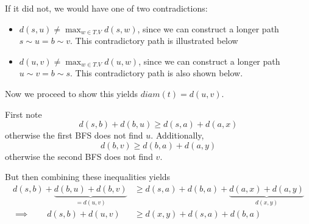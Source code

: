 \documentclass[paper=a4, fontsize=11pt]{scrartcl} %
\numberwithin{equation}{section} %
\numberwithin{figure}{section} %
\numberwithin{table}{section} %
\begin{document}
If it did not, we would have one of two contradictions:
\begin{itemize}
\item $d(s,u) \ne \max_{w \in T.V} d(s, w)$, since we can construct a longer path $s \sim u = b \sim v$. This contradictory path is illustrated below

\begin{center}
\end{center}

\item $d(u,v) \ne \max_{w \in T.V} d(u, w)$, since we can construct a longer path $u \sim v = b \sim s$. This contradictory path is also shown below.

\begin{center}
\end{center}
\end{itemize}

Now we proceed to show this yields $diam(t)  = d(u,v)$.

First note
\[d(s, b) + d(b, u) \geq d(s,a) + d(a,x)\]
otherwise the first BFS does not find $u$.
Additionally, 
\[d(b, v) \geq d(b,a) + d(a,y)\]
otherwise the second BFS does not find $v$.

But then combining these inequalities yields
\begin{align*}
d(s,b) + \underbrace{d(b,u) + d(b,v)}_{=d(u,v)} &\geq d(s,a) + d(b,a) + \underbrace{d(a,x) + d(a,y)}_{d(x,y)} \\
\implies \qquad{} d(s,b) + d(u,v) &\geq d(x,y) + d(s,a) + d(b,a)
\end{align*}
\end{document}
